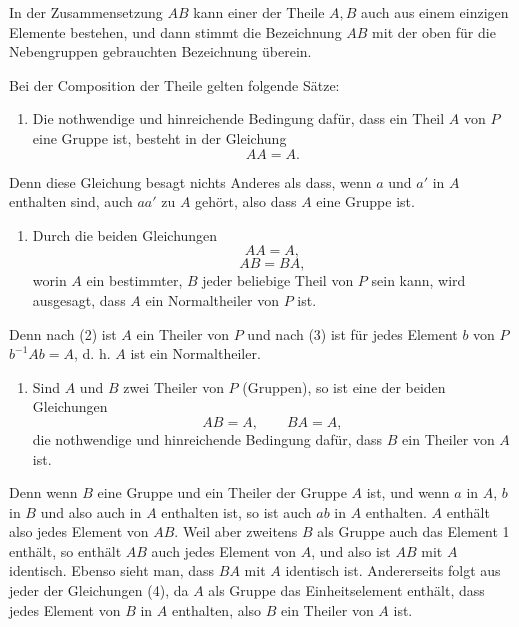 \documentclass[11pt]{article}
\begin{document}
In der Zusammensetzung $AB$ kann einer der Theile $A,B$ auch aus einem einzigen Elemente bestehen, und dann stimmt die Bezeichnung $AB$ mit der oben für die Nebengruppen gebrauchten Bezeichnung überein.

Bei der Composition der Theile gelten folgende Sätze:

\begin{enumerate}[label=\arabic*.]
\item Die nothwendige und hinreichende Bedingung dafür, dass ein Theil $A$ von $P$ eine Gruppe ist, besteht in der Gleichung
\begin{equation}
AA=A.
\tag{1}
\end{equation}
\end{enumerate}
Denn diese Gleichung besagt nichts Anderes als dass, wenn $a$ und $a'$ in $A$ enthalten sind, auch $aa'$ zu $A$ gehört, also dass $A$ eine Gruppe ist.

\begin{enumerate}[resume,label=\arabic*.]
\item Durch die beiden Gleichungen
\begin{equation}
AA=A,
\tag{2}
\end{equation}
\begin{equation}
AB=BA,
\tag{3}
\end{equation}
worin $A$ ein bestimmter, $B$ jeder beliebige Theil von $P$ sein kann, wird ausgesagt, dass $A$ ein Normaltheiler von $P$ ist.
\end{enumerate}
Denn nach (2) ist $A$ ein Theiler von $P$ und nach (3) ist für jedes Element $b$ von $P$ $b^{-1}Ab=A$, d. h. $A$ ist ein Normaltheiler.

\begin{enumerate}[resume,label=\arabic*.]
\item Sind $A$ und $B$ zwei Theiler von $P$ (Gruppen), so ist eine der beiden Gleichungen
\begin{equation}
AB=A,\qquad BA=A,
\tag{4}
\end{equation}
die nothwendige und hinreichende Bedingung dafür, dass $B$ ein Theiler von $A$ ist.
\end{enumerate}
Denn wenn $B$ eine Gruppe und ein Theiler der Gruppe $A$ ist, und wenn $a$ in $A$, $b$ in $B$ und also auch in $A$ enthalten ist, so ist auch $ab$ in $A$ enthalten. $A$ enthält also jedes Element von $AB$. Weil aber zweitens $B$ als Gruppe auch das Element 1 enthält, so enthält $AB$ auch jedes Element von $A$, und also ist $AB$ mit $A$ identisch. Ebenso sieht man, dass $BA$ mit $A$ identisch ist. Andererseits folgt aus jeder der Gleichungen (4), da $A$ als Gruppe das Einheitselement enthält, dass jedes Element von $B$ in $A$ enthalten, also $B$ ein Theiler von $A$ ist.
\end{document}
